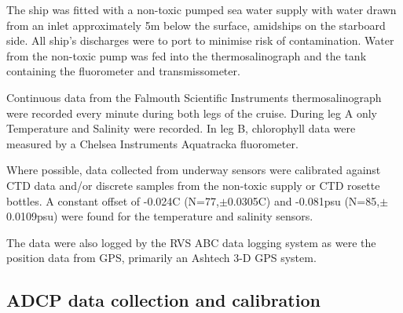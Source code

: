 The ship was fitted with a non-toxic pumped sea water supply with
water drawn from an inlet approximately 5m below the surface,
amidships on the starboard side. All ship's discharges were to
port to minimise risk of contamination. Water from the non-toxic
pump was fed into the thermosalinograph and the tank containing
the fluorometer and transmissometer.

Continuous data from the Falmouth Scientific Instruments
thermosalinograph were recorded every minute during both legs of
the cruise. During leg A only Temperature and Salinity were
recorded. In leg B,  chlorophyll data were measured by a Chelsea
Instruments Aquatracka fluorometer.

Where possible, data collected from underway sensors were
calibrated against CTD data and/or discrete samples from the
non-toxic supply or CTD rosette bottles. A constant offset of
-0.024\deg C (N=77,$\pm$0.0305\deg C) and -0.081psu
(N=85,$\pm$0.0109psu) were found for the temperature and salinity
sensors.

The data were also logged by the RVS ABC data logging system as
were the position data from GPS, primarily an Ashtech 3-D GPS
system.

\subsection{ADCP data collection and calibration}
